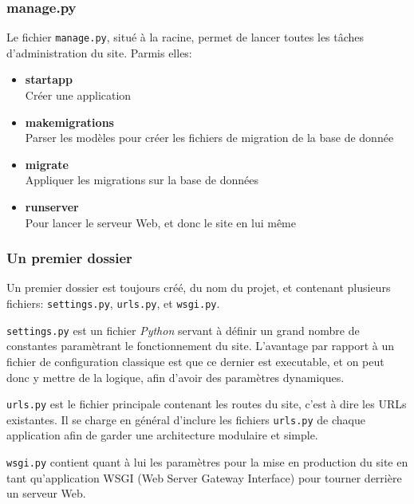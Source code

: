 \documentclass[a4paper]{report}
\begin{document}
\subsubsection{manage.py}
\label{ssub:manage.py}

\par Le fichier \verb-manage.py-, situé à la racine, permet de lancer toutes les tâches d'administration du site. Parmis
elles:
\begin{itemize}
    \item \textbf{startapp} \\
        Créer une application
    \item \textbf{makemigrations} \\
        Parser les modèles pour créer les fichiers de migration de la base de donnée
    \item \textbf{migrate} \\
        Appliquer les migrations sur la base de données
    \item \textbf{runserver} \\
        Pour lancer le serveur Web, et donc le site en lui même
\end{itemize}

\subsubsection{Un premier dossier}
\label{ssub:Un premier dossier}
\par Un premier dossier est toujours créé, du nom du projet, et contenant plusieurs fichiers: \verb#settings.py#,
\verb#urls.py#, et \verb#wsgi.py#.

\par \verb#settings.py# est un fichier \emph{Python} servant à définir un grand nombre de constantes paramètrant le
fonctionnement du site. L'avantage par rapport à un fichier de configuration classique est que ce dernier est
executable, et on peut donc y mettre de la logique, afin d'avoir des paramètres dynamiques.

\par \verb#urls.py# est le fichier principale contenant les routes du site, c'est à dire les URLs existantes. Il se
charge en général d'inclure les fichiers \verb#urls.py# de chaque application afin de garder une architecture modulaire
et simple.

\par \verb#wsgi.py# contient quant à lui les paramètres pour la mise en production du site en tant qu'application WSGI
(Web Server Gateway Interface) pour tourner derrière un serveur Web.
\end{document}

